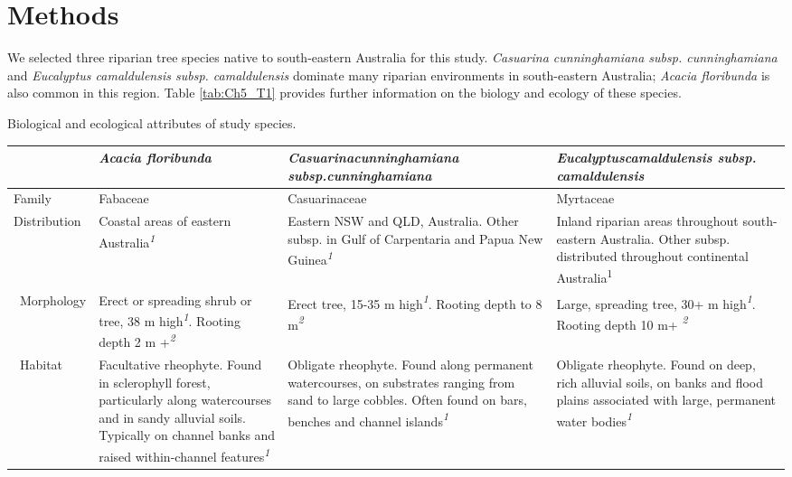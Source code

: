 \documentclass[12pt,a4paper]{memoir}
\begin{document}
\section{Methods}
We selected three riparian tree species native to south-eastern Australia for this study. \textit{Casuarina cunninghamiana subsp. cunninghamiana} and \textit{Eucalyptus camaldulensis subsp. camaldulensis} dominate many riparian environments in south-eastern Australia; \textit{Acacia floribunda} is also common in this region. Table \ref{tab:Ch5_T1} provides further information on the biology and ecology of these species.

\begin{threeparttable}[ht]
\tiny
\centering
\caption[Biological and ecological attributes of study species.]{\small{Biological and ecological attributes of study species.}}
\label{tab:Ch5_T1}
\begin{tabularx}{\textwidth}{XXXX}
\hline
 & {\textit{Acacia floribunda}} & {\textit{Casuarina\newline cunninghamiana subsp.\newline cunninghamiana}} & {\textit{Eucalyptus\newline camaldulensis subsp. camaldulensis}} \\ \hline
Family & Fabaceae & Casuarinaceae & Myrtaceae \\
Distribution & Coastal areas of eastern Australia\textit{\textsuperscript{1}} & Eastern NSW and QLD, Australia. Other subsp. in Gulf of Carpentaria and Papua New Guinea\textit{\textsuperscript{1}} & Inland riparian areas throughout south-eastern Australia. Other subsp. distributed throughout continental Australia\textsuperscript{1} \\ \
Morphology & Erect or spreading shrub or tree, 38 m high\textit{\textsuperscript{1}}. Rooting depth 2 m +\textit{\textsuperscript{2}} & Erect tree, 15-35 m high\textit{\textsuperscript{1}}. Rooting depth to 8 m\textit{\textsuperscript{2}} & Large, spreading tree, 30+ m high\textit{\textsuperscript{1}}. Rooting depth 10 m+ \textit{\textsuperscript{2}} \\ \
Habitat & Facultative rheophyte. Found in sclerophyll forest, particularly along watercourses and in sandy alluvial soils. Typically on channel banks and raised within-channel features\textit{\textsuperscript{1}} & Obligate rheophyte. Found along permanent watercourses, on substrates ranging from sand to large cobbles. Often found on bars, benches and channel islands\textit{\textsuperscript{1}} & Obligate rheophyte. Found on deep, rich alluvial soils, on banks and flood plains associated with large, permanent water bodies\textit{\textsuperscript{1}} \\ 

\end{tabularx}
\end{threeparttable}
\end{document}
